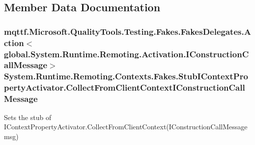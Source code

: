 \subsection{Member Data Documentation}
\hypertarget{class_system_1_1_runtime_1_1_remoting_1_1_contexts_1_1_fakes_1_1_stub_i_context_property_activator_a2c76b625e10636889ef650b80f332e2f}{
\subsubsection[{Collect\-From\-Client\-Context\-I\-Construction\-Call\-Message}]{\setlength{\rightskip}{0pt plus 5cm}mqttf.\-Microsoft.\-Quality\-Tools.\-Testing.\-Fakes.\-Fakes\-Delegates.\-Action$<$global.\-System.\-Runtime.\-Remoting.\-Activation.\-I\-Construction\-Call\-Message$>$ System.\-Runtime.\-Remoting.\-Contexts.\-Fakes.\-Stub\-I\-Context\-Property\-Activator.\-Collect\-From\-Client\-Context\-I\-Construction\-Call\-Message}}\label{class_system_1_1_runtime_1_1_remoting_1_1_contexts_1_1_fakes_1_1_stub_i_context_property_activator_a2c76b625e10636889ef650b80f332e2f}


Sets the stub of I\-Context\-Property\-Activator.\-Collect\-From\-Client\-Context(\-I\-Construction\-Call\-Message msg)

